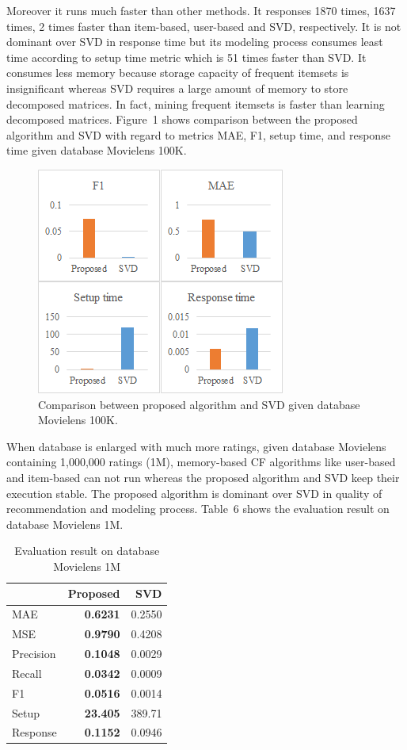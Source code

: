 \documentclass{article}
\begin{document}
Moreover it runs much faster than other methods. It responses 1870 times, 1637 times, 2 times faster than item-based, user-based and SVD, respectively. It is not dominant over SVD in response time but its modeling process consumes least time according to setup time metric which is 51 times faster than SVD. It consumes less memory because storage capacity of frequent itemsets is insignificant whereas SVD requires a large amount of memory to store decomposed matrices. In fact, mining frequent itemsets is faster than learning decomposed matrices. Figure~1 shows comparison between the proposed algorithm and SVD with regard to metrics MAE, F1, setup time, and response time given database Movielens 100K.
\begin{figure} \label{figure:comparison100k}
\centering
\includegraphics{Comparison100K.png}
\caption{Comparison between proposed algorithm and SVD given database Movielens 100K.}
\label{figure:time100K}
\end{figure}

When database is enlarged with much more ratings, given database Movielens containing 1,000,000 ratings (1M), memory-based CF algorithms like user-based and item-based can not run whereas the proposed algorithm and SVD keep their execution stable. The proposed algorithm is dominant over SVD in quality of recommendation and modeling process. Table~6 shows the evaluation result on database Movielens 1M.
\begin{table} \label{table:evaluation.result.1M}
\setlength{\tabcolsep}{4pt}
\centering
\caption{Evaluation result on database Movielens 1M}
\begin{tabular}{|l|r|r|} \hline
&\textbf{Proposed}&SVD\\ \hline
MAE&\textbf{0.6231}&0.2550\\ \hline
MSE&\textbf{0.9790}&0.4208\\ \hline
Precision&\textbf{0.1048}&0.0029\\ \hline
Recall&\textbf{0.0342}&0.0009\\ \hline
F1&\textbf{0.0516}&0.0014\\ \hline
Setup&\textbf{23.405}&389.71\\ \hline
Response&\textbf{0.1152}&0.0946\\ \hline
\end{tabular}
\end{table}
\end{document}
